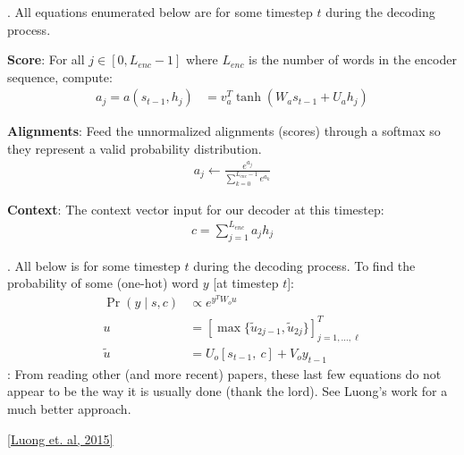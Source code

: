 \documentclass[11pt]{article}
\newcommand\myspace[1][]{\vspace{#1\bigskipamount}}
\newcommand\p{\Needspace{10\baselineskip} \noindent}
\begin{document}
\myspace 
\p {}. All equations enumerated below are for some timestep $t$ during the decoding process.
\begin{compactenum}
	\item \textbf{Score}: For all $j \in [0, L_{enc}-1]$ where $L_{enc}$ is the number of words in the encoder sequence, compute:
	\begin{align}
		a_j = a(s_{t - 1}, h_j) &= v_a^T \tanh\left( W_a s_{t - 1} + U_a h_j \right)
	\end{align}
	
	\item \textbf{Alignments}: Feed the unnormalized alignments (scores) through a softmax so they represent a valid probability distribution.
	\begin{align}
		a_j \leftarrow \frac{e^{a_j}}{\sum_{k = 0}^{L_{enc}-1} e^{a_k}}
	\end{align}
	
	\item \textbf{Context}: The context vector input for our decoder at this timestep:
	\begin{align}
		c = \sum_{j = 1}^{L_{enc}} a_j h_j
	\end{align}
\end{compactenum}

\myspace
\p {}. All below is for some timestep $t$ during the decoding process. To find the probability of some (one-hot) word $y$ [at timestep $t$]:
\begin{align}
	\Pr\left(y \mid s, c \right) &\propto e^{y^T W_o u} \\
	u &= \left[\max\{ \tilde u_{2j - 1}, \tilde u_{2j} \}\right]_{j = 1,\ldots, \ell}^T \\
	\tilde u &= U_o [s_{t - 1}, ~ c] + V_o y_{t - 1}
\end{align}
: From reading other (and more recent) papers, these last few equations do not appear to be the way it is usually done (thank the lord). See Luong's work for a much better approach.


\href{https://arxiv.org/abs/1508.04025}{[Luong et. al, 2015]}
\end{document}
